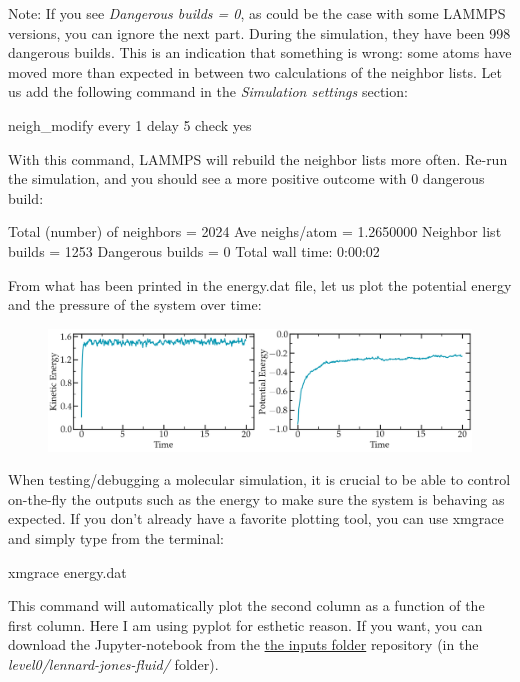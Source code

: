 \noindent Note: If you see \textit{Dangerous builds = 0}, as could be
the case with some LAMMPS versions, you can ignore
the next part.
During the simulation, they have been 998 dangerous builds.
This is an indication that something is wrong: some atoms
have moved more than expected in between two calculations of
the neighbor lists. Let us add the following command in the
\textit{Simulation settings} section:

\begin{lcverbatim}
neigh_modify every 1 delay 5 check yes
\end{lcverbatim}

\noindent With this command, LAMMPS will rebuild the neighbor lists
more often. Re-run the simulation, and you should see a more
positive outcome with 0 dangerous build:

\begin{lcverbatim}
Total (number) of neighbors = 2024
Ave neighs/atom = 1.2650000
Neighbor list builds = 1253
Dangerous builds = 0
Total wall time: 0:00:02
\end{lcverbatim}

\noindent From what has been printed in the energy.dat file, let us
plot the potential energy and the pressure of
the system over time:

\begin{figure}
\includegraphics[width=\linewidth]{tutorials/level0/lennard-jones-fluid/energy-light.png}
\end{figure}

\begin{tcolorbox}[colback=mylightblue!5!white,colframe=mylightblue!75!black,title=On the necessity of plotting data efficiently]
When testing/debugging a molecular simulation, it is crucial to be able to control 
on-the-fly the outputs such as the energy to make sure the
system is behaving as expected. If you don't already have 
a favorite plotting tool, you can use xmgrace and simply type from the terminal:
\begin{lcverbatim}
xmgrace energy.dat
\end{lcverbatim}

\noindent This command will automatically plot the second column as a function of the first column.
Here I am using pyplot for esthetic reason. If you want, you can download the Jupyter-notebook
from the \href{https://github.com/lammpstutorials/lammpstutorials.github.io/tree/version2.0/docs/inputs}{the inputs folder} repository (in the \textit{level0/lennard-jones-fluid/} folder).
\end{tcolorbox}

